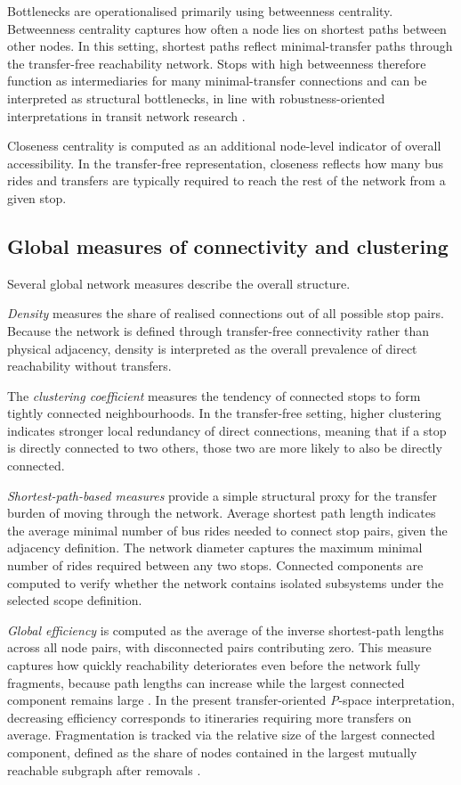 \documentclass[12pt,a4paper,oneside]{report}
\newcommand{\pspace}{\textit{P}-space}
\begin{document}
Bottlenecks are operationalised primarily using betweenness centrality.
Betweenness centrality captures how often a node lies on shortest paths between other nodes.
In this setting, shortest paths reflect minimal-transfer paths through the transfer-free reachability network.
Stops with high betweenness therefore function as intermediaries for many minimal-transfer connections and can be interpreted as structural bottlenecks, in line with robustness-oriented interpretations in transit network research \citep{derrible2010}.

Closeness centrality is computed as an additional node-level indicator of overall accessibility.
In the transfer-free representation, closeness reflects how many bus rides and transfers are typically required to reach the rest of the network from a given stop.

\subsection{Global measures of connectivity and clustering}\label{sec:global-measures}

Several global network measures describe the overall structure.

\emph{Density} measures the share of realised connections out of all possible stop pairs.
Because the network is defined through transfer-free connectivity rather than physical adjacency, density is interpreted as the overall prevalence of direct reachability without transfers.

The \emph{clustering coefficient} measures the tendency of connected stops to form tightly connected neighbourhoods.
In the transfer-free setting, higher clustering indicates stronger local redundancy of direct connections, meaning that if a stop is directly connected to two others, those two are more likely to also be directly connected.

\emph{Shortest-path-based measures} provide a simple structural proxy for the transfer burden of moving through the network.
Average shortest path length indicates the average minimal number of bus rides needed to connect stop pairs, given the adjacency definition.
The network diameter captures the maximum minimal number of rides required between any two stops.
Connected components are computed to verify whether the network contains isolated subsystems under the selected scope definition.

\emph{Global efficiency} is computed as the average of the inverse shortest-path lengths across all node pairs, with disconnected pairs contributing zero.
This measure captures how quickly reachability deteriorates even before the network fully fragments, because path lengths can increase while the largest connected component remains large \citep{latora2001}.
In the present transfer-oriented \pspace{} interpretation, decreasing efficiency corresponds to itineraries requiring more transfers on average.
Fragmentation is tracked via the relative size of the largest connected component, defined as the share of nodes contained in the largest mutually reachable subgraph after removals \citep{albert2000}.
\end{document}
